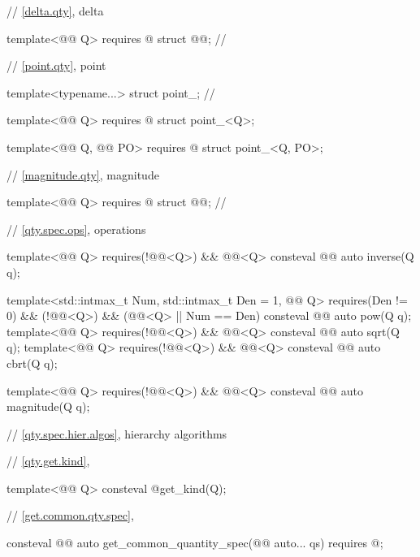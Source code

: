 \begin{codeblock}
{// \ref{delta.qty}, delta

template<@@ Q>
  requires @\seebelownc@
struct @@;  // \expos

// \ref{point.qty}, point

template<typename...>
struct point_;  // \notdef

template<@@ Q>
  requires @\seebelownc@
struct point_<Q>;

template<@@ Q, @@ PO>
  requires @\seebelownc@
struct point_<Q, PO>;

// \ref{magnitude.qty}, magnitude

template<@@ Q>
  requires @\seebelownc@
struct @@;  // \expos

// \ref{qty.spec.ops}, operations

template<@@ Q>
  requires(!@@<Q>) && @@<Q>
consteval @@ auto inverse(Q q);

template<std::intmax_t Num, std::intmax_t Den = 1, @@ Q>
  requires(Den != 0) && (!@@<Q>) && (@@<Q> || Num == Den)
consteval @@ auto pow(Q q);
template<@@ Q>
  requires(!@@<Q>) && @@<Q>
consteval @@ auto sqrt(Q q);
template<@@ Q>
  requires(!@@<Q>) && @@<Q>
consteval @@ auto cbrt(Q q);

template<@@ Q>
  requires(!@@<Q>) && @@<Q>
consteval @@ auto magnitude(Q q);

// \ref{qty.spec.hier.algos}, hierarchy algorithms

// \ref{qty.get.kind}, 

template<@@ Q>
consteval @\seebelownc@ get_kind(Q);

// \ref{get.common.qty.spec}, 

consteval @@ auto get_common_quantity_spec(@@ auto... qs)
  requires @\seebelownc@;

}
\end{codeblock}
